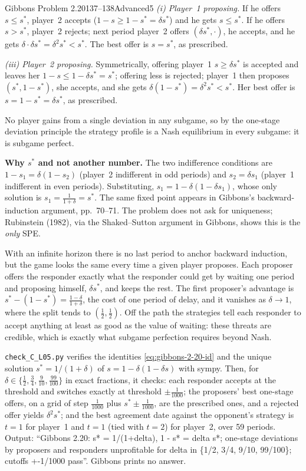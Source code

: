\begin{exsol}{Gibbons Problem 2.20}{137--138}{Advanced}{5}
\emph{(i) Player~1 proposing.} If he offers $s \le s^*$, player~2 accepts ($1 - s \ge 1 - s^* = \delta
s^*$) and he gets $s \le s^*$. If he offers $s > s^*$, player~2 rejects; next period player~2 offers
$(\delta s^*, \cdot)$, he accepts, and he gets $\delta \cdot \delta s^* = \delta^2 s^* < s^*$. The best
offer is $s = s^*$, as prescribed.

\emph{(iii) Player~2 proposing.} Symmetrically, offering player~1 $s \ge \delta s^*$ is accepted and
leaves her $1 - s \le 1 - \delta s^* = s^*$; offering less is rejected; player~1 then proposes $(s^*, 1-s^*)$, she
accepts, and she gets $\delta(1 - s^*) = \delta^2 s^* < s^*$. Her best offer is $s = 1 - s^* = \delta s^*$, as prescribed.

No player gains from a single deviation in any subgame, so by the one-stage deviation principle the
strategy profile is a Nash equilibrium in every subgame: it is subgame perfect.

\textbf{Why $s^*$ and not another number.} The two indifference conditions are $1 - s_1 = \delta(1 -
s_2)$ (player~2 indifferent in odd periods) and $s_2 = \delta s_1$ (player~1 indifferent in even
periods). Substituting, $s_1 = 1 - \delta(1 - \delta s_1)$, whose only solution is $s_1 =
\frac{1}{1+\delta} = s^*$. The same fixed point appears in Gibbons's backward-induction argument,
pp.~70--71. The problem does not ask for uniqueness; Rubinstein (1982), via the Shaked--Sutton
argument in Gibbons, shows this is the \emph{only} SPE.

\interp With an infinite horizon there is no last period to anchor backward induction, but the game
looks the same every time a given player proposes. Each proposer offers the responder exactly what
the responder could get by waiting one period and proposing himself, $\delta s^*$, and keeps the rest.
The first proposer's advantage is $s^* - (1 - s^*) = \frac{1-\delta}{1+\delta}$, the cost of one period of
delay, and it vanishes as $\delta \to 1$, where the split tends to $(\frac12, \frac12)$. Off the path the
strategies tell each responder to accept anything at least as good as the value of waiting: these
threats are credible, which is exactly what subgame perfection requires beyond Nash.

\verify \texttt{check\_C\_L05.py} verifies the identities \eqref{eq:gibbons-2-20-id} and the unique
solution $s^* = 1/(1+\delta)$ of $s = 1 - \delta(1 - \delta s)$ with sympy. Then, for $\delta \in \{\frac12,
\frac34, \frac9{10}, \frac{99}{100}\}$ in exact fractions, it checks: each responder accepts at the
threshold and switches exactly at threshold $\pm\frac1{1000}$; the proposers' best one-stage offers,
on a grid of step $\frac1{1000}$ plus $s^*\pm\frac1{1000}$, are the prescribed ones, and a rejected offer
yields $\delta^2 s^*$; and the best agreement date against the opponent's strategy is $t = 1$ for player~1
and $t = 1$ (tied with $t = 2$) for player~2, over 59 periods. Output: ``Gibbons 2.20: s* = 1/(1+delta),
1 - s* = delta s*; one-stage deviations by proposers and responders unprofitable for delta in \{1/2,
3/4, 9/10, 99/100\}; cutoffs +-1/1000 pass''. Gibbons prints no answer.


\end{exsol}
